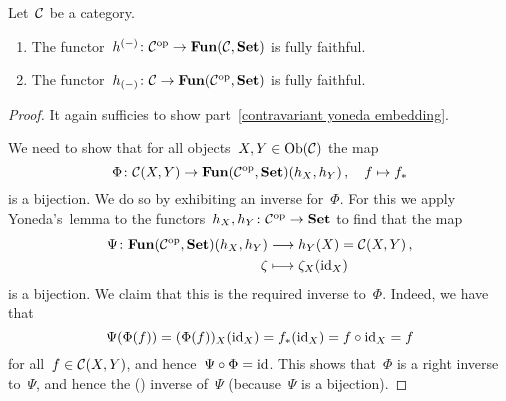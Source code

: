 \begin{theorem}
  Let~$\mathcal{C}$ be a category.
  \begin{enumerate}
    \item
      The functor~$h^{(-)} \colon \mathcal{C}^{\mathrm{op}} \to \mathbf{Fun}(\mathcal{C}, \mathbf{Set})$ is fully faithful.
    \item
      \label{contravariant yoneda embedding}
      The functor~$h_{(-)} \colon \mathcal{C} \to \mathbf{Fun}(\mathcal{C}^{\mathrm{op}}, \mathbf{Set})$ is fully faithful.
  \end{enumerate}
\end{theorem}


\begin{proof}
  It again sufficies to show part~\ref*{contravariant yoneda embedding}.
  
  We need to show that for all objects~$X, Y \in \operatorname{Ob}(\mathcal{C})$ the map
  \[
            \Phi
    \colon  \mathcal{C}(X,Y)
    \to     \mathbf{Fun}(\mathcal{C}^{\mathrm{op}}, \mathbf{Set})(h_X, h_Y) \,,
    \quad   f
    \mapsto f_*
  \]
  is a bijection.
  We do so by exhibiting an inverse for~$\Phi$.
  For this we apply Yoneda’s~lemma to the functors~$h_X, h_Y \colon \mathcal{C}^{\mathrm{op}} \to \mathbf{Set}$ to find that the map
  \begin{align*}
              \Psi
     \colon   \mathbf{Fun}(\mathcal{C}^{\mathrm{op}}, \mathbf{Set})(h_X, h_Y)
    &\longrightarrow  h_Y(X)
     =        \mathcal{C}(X,Y)  \,,
    \\
                  \zeta
    &\longmapsto  \zeta_X(\mathrm{id}_X)
  \end{align*}
  is a bijection.
  We claim that this is the required inverse to~$\Phi$.
  Indeed, we have that
  \[
      \Psi(\Phi(f))
    = (\Phi(f))_X(\mathrm{id}_X)
    = f_*(\mathrm{id}_X)
    = f \circ \mathrm{id}_X
    = f
  \]
  for all~$f \in \mathcal{C}(X,Y)$, and hence~$\Psi \circ \Phi = \mathrm{id}$.
  This shows that~$\Phi$ is a right inverse to~$\Psi$, and hence the ({\twosided}) inverse of~$\Psi$ (because~$\Psi$ is a bijection).

\end{proof}
